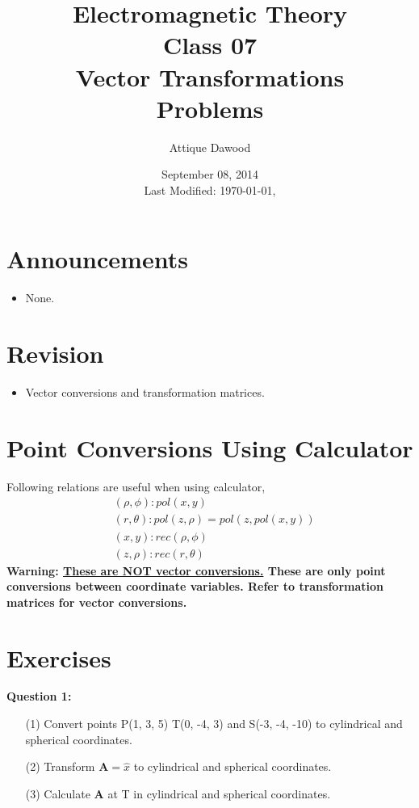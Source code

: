 \documentclass[12pt,a4paper]{article}
\title{Electromagnetic Theory\\Class 07\\Vector Transformations\\Problems}
\author{Attique Dawood}
\date{September 08, 2014\\[0.2cm] Last Modified: \today, \currenttime}
\begin{document}
\maketitle
\section{Announcements}
\begin{itemize}
\item None.
\end{itemize}
\section{Revision}
\begin{itemize}
\item Vector conversions and transformation matrices.
\end{itemize}
\section{Point Conversions Using Calculator}
Following relations are useful when using calculator,
\begin{equation*}
\begin{split}
&(\rho, \phi): pol(x,y)\\
&(r, \theta): pol(z, \rho) = pol(z, pol(x, y))\\
&(x, y): rec(\rho, \phi)\\
&(z, \rho): rec(r, \theta)
\end{split}
\end{equation*}
\textbf{Warning: \underline{These are NOT vector conversions.} These are only point conversions between coordinate variables. Refer to transformation matrices for vector conversions.}
\section{Exercises}
\noindent\textbf{Question 1:}
\begin{itemize}
\item[(1)] Convert points P(1, 3, 5) T(0, -4, 3) and S(-3, -4, -10) to cylindrical and spherical coordinates.
\item[(2)] Transform \textbf{A}$=\hat x$ to cylindrical and spherical coordinates.
\item[(3)] Calculate \textbf{A} at T in cylindrical and spherical coordinates.
\end{itemize}


\end{document}
